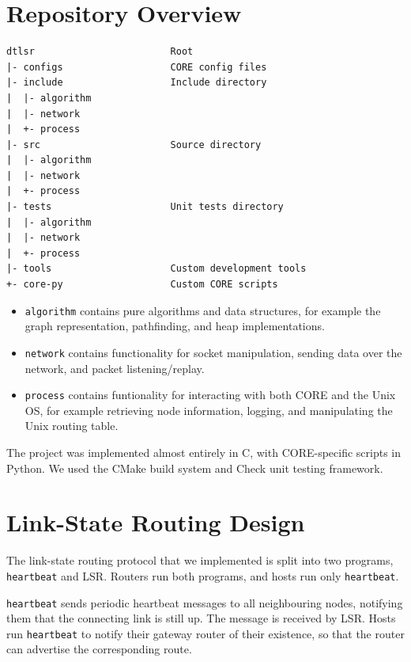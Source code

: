 \documentclass[withindex,glossary,openany]{cam-thesis}
\begin{document}
\section{Repository Overview}
\begin{minipage}{1\textwidth} \centering
\begin{lstlisting}[label=repository, frame=tb]
dtlsr                        Root
|- configs                   CORE config files
|- include                   Include directory
|  |- algorithm
|  |- network
|  +- process
|- src                       Source directory
|  |- algorithm
|  |- network
|  +- process
|- tests                     Unit tests directory
|  |- algorithm
|  |- network
|  +- process
|- tools                     Custom development tools
+- core-py                   Custom CORE scripts
\end{lstlisting}
\end{minipage}

\begin{itemize}
	\item
	\texttt{algorithm} contains pure algorithms and data structures, for example the graph representation, pathfinding, and heap implementations.

	\item
	\texttt{network} contains functionality for socket manipulation, sending data over the network, and packet listening/replay.
	
	\item
	\texttt{process} contains funtionality for interacting with both CORE and the Unix OS, for example retrieving node information, logging, and manipulating the Unix routing table.
\end{itemize}

The project was implemented almost entirely in C, with CORE-specific scripts in Python. We used the CMake build system and Check unit testing framework.

\section{Link-State Routing Design}

The link-state routing protocol that we implemented is split into two programs, \texttt{heartbeat} and LSR.  Routers run both programs, and hosts run only \texttt{heartbeat}.

\texttt{heartbeat} sends periodic heartbeat messages to all neighbouring nodes, notifying them that the connecting link is still up. The message is received by LSR. Hosts run \texttt{heartbeat} to notify their gateway router of their existence, so that the router can advertise the corresponding route.
\end{document}
